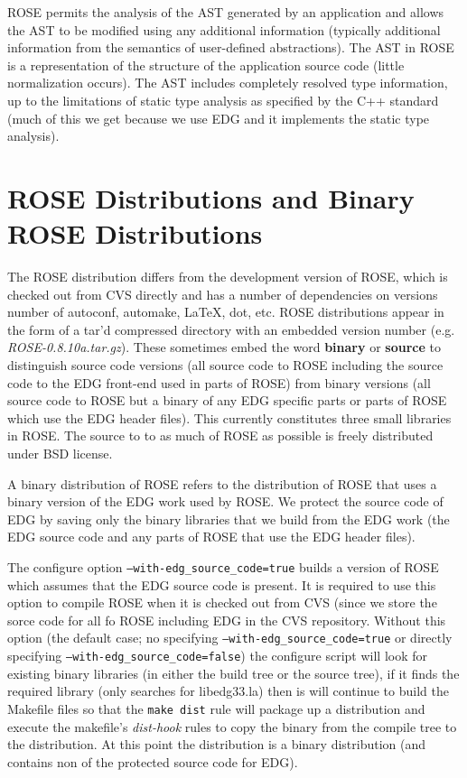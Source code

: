    ROSE permits the analysis of the AST generated by an application and allows the AST to
be modified using any additional information (typically additional information from the
semantics of user-defined abstractions). The AST in ROSE is a representation of the 
structure of the application source code (little normalization occurs). The AST includes
completely resolved type information, up to the limitations of static type analysis as
specified by the C++ standard (much of this we get because we use EDG and it implements
the static type analysis).


\section{ROSE Distributions and Binary ROSE Distributions}

   The ROSE distribution differs from the development version of ROSE, which
is checked out from CVS directly and has a number of dependencies on versions
number of autoconf, automake, LaTeX, dot, etc.  ROSE distributions appear in
the form of a tar'd compressed directory with an embedded version number 
(e.g. {\it ROSE-0.8.10a.tar.gz}). These sometimes embed the word {\bf binary} or {\bf source}
to distinguish source code versions (all source code to ROSE including the source code 
to the EDG front-end used in parts of ROSE) from binary versions (all source code to ROSE
but a binary of any EDG specific parts or parts of ROSE which use the EDG header files).
This currently constitutes three small libraries in ROSE.  The source to to as much of
ROSE as possible is freely distributed under BSD license.

   A binary distribution of ROSE refers to the distribution of ROSE that uses a binary
version of the EDG work used by ROSE.  We protect the source code of EDG by saving only 
the binary libraries that we build from the EDG work (the EDG source code and any parts 
of ROSE that use the EDG header files).  

The configure option {\tt --with-edg_source_code=true} builds a version of ROSE which assumes
that the EDG source code is present. It is required to use this option to compile ROSE 
when it is checked out from CVS (since we store the sorce code for all fo ROSE including
EDG in the CVS repository.  Without this option (the default case; no specifying 
{\tt --with-edg_source_code=true} or directly specifying {\tt --with-edg_source_code=false}) the 
configure script will look for existing binary libraries (in either the build tree or the
source tree), if it finds the required library (only searches for libedg33.la) then
is will continue to build the Makefile files so that the {\tt make dist} rule will package up
a distribution and execute the makefile's {\it dist-hook} rules to copy the binary from the 
compile tree to the distribution.  At this point the distribution is a binary distribution
(and contains non of the protected source code for EDG).

